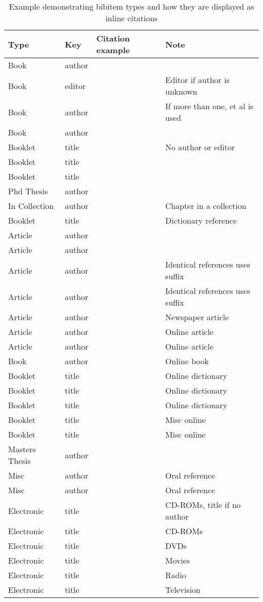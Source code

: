 \begin{table}[h]
\caption{Example demonstrating bibitem types and how they are displayed as inline citations}
\footnotesize
\begin{tabular}{l l l l}
Type & Key & Citation example & Note \\
\hline
Book & author & \citet{bj08} \\
Book & editor & \citet{ma07} & Editor if author is unknown \\
Book & author & \citet{bes08} & If more than one, et al is used \\
Book & author & \citet{chr08} \\
Booklet & title & \citet{kk96} & No author or editor \\
Booklet & title & \citet{ss08} \\
Booklet & title & \citet{yo07} \\
Phd Thesis & author & \citet{ms08} \\
In Collection & author & \citet{ue07} & Chapter in a collection \\
Booklet & title & \citet{so93} & Dictionary reference\\
Article & author & \citet{jh08} \\
Article & author & \citet{jk08} \\
Article & author & \citet{js08a} & Identical references uses suffix\\
Article & author & \citet{js08b} & Identical references uses suffix\\
Article & author & \citet{mb09} & Newspaper article \\
Article & author & \citet{sd06} & Online article\\
Article & author & \citet{vak04} & Online article\\
Book & author & \citet{pc03} & Online book\\
Booklet & title & \citet{eb09} & Online dictionary\\
Booklet & title & \citet{ne09} & Online dictionary\\
Booklet & title & \citet{oed98} & Online dictionary\\
Booklet & title & \citet{um09} & Misc online\\
Booklet & title & \citet{ff09} & Misc online\\
Masters Thesis & author & \citet{yf07} \\
Misc & author & \citet{es01} & Oral reference \\
Misc & author & \citet{ks08} & Oral reference \\
Electronic & title & \citet{ea05} & CD-ROMs, title if no author \\
Electronic & title & \citet{ns03} & CD-ROMs\\
Electronic & title & \citet{jp05} & DVDs\\
Electronic & title & \citet{ssh04} & Movies\\
Electronic & title & \citet{fapp09} & Radio\\
Electronic & title & \citet{kn09} & Television\\
\end{tabular}
\end{table}

